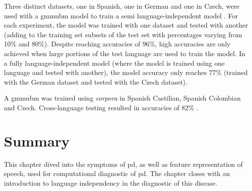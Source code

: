 Three distinct datasets, one in Spanish, one in German and one in Czech, were used with a \gls{gmmubm} model to train a semi language-independent model \cite{parkinson_three_languages}. For each experiment, the model was trained with one dataset and tested with another (adding to the training set subsets of the test set with percentages varying from 10\% and 80\%). Despite reaching accuracies of 96\%, high accuracies are only achieved when large portions of the test language are used to train the model. In a fully language-independent model (where the model is trained using one language and tested with another), the model accuracy only reaches 77\% (trained with the German dataset and tested with the Czech dataset).

A \gls{gmmubm} was trained using \textit{corpora} in Spanish Castilian, Spanish Colombian and Czech. Cross-language testing resulted in accuracies of 82\% \cite{parkinson_phonemic_relevance}.

\section{Summary}

This chapter dived into the symptoms of \gls{pd}, as well as feature representation of speech, used for computational diagnostic of \gls{pd}. The chapter closes with an introduction to language independency in the diagnostic of this disease.

